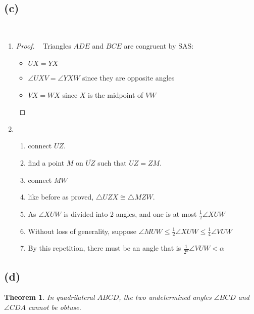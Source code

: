 \documentclass{article}
\newtheorem{theorem}{Theorem}
\begin{document}
~

\subsection*{(c)}

~

\begin{enumerate}
    \item \begin{proof}
        ~
    Triangles \( ADE \) and \( BCE \) are congruent by SAS:
       \begin{itemize}
       \item \( UX = YX \)
       \item \(\angle UXV=\angle YXW\) since they are opposite angles
       \item \( VX=WX\) since \(X\) is the midpoint of \(VW\)
       \end{itemize}
    \end{proof}

    \item \begin{enumerate}
        \item connect \(UZ\).
        
        \item find a point \(M\) on \(\overline{UZ}\) such that \(UZ=ZM\).

        \item connect \(MW\)

        \item like before as proved, \(\triangle UZX \cong \triangle MZW\).

        \item As \(\angle XUW\) is divided into 2 angles, and one is at most \(\frac{1}{2}\angle XUW\)

        \item Without loss of generality, suppose \(\angle MUW \leq \frac{1}{2}\angle XUW\leq \frac{1}{4}\angle VUW\)

        \item By this repetition, there must be an angle that is \(\frac{1}{2^n}\angle VUW < \alpha\)
    \end{enumerate}
\end{enumerate}

\subsection*{(d)}

\begin{theorem}
In quadrilateral \( ABCD \), the two undetermined angles \( \angle BCD \) and \( \angle CDA \) cannot be obtuse.
\end{theorem}
\end{document}

